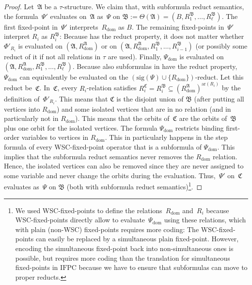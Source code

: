 \documentclass[]{lmcs}
\newcommand{\set}[1]{\lbrace #1 \rbrace}
\newcommand{\formA}{\Phi}
\newcommand{\formB}{\Psi}
\newcommand{\interpret}{\Theta}
\newcommand{\rel}{R}
\newcommand{\StructA}{\mathfrak{A}}
\newcommand{\StructB}{\mathfrak{B}}
\newcommand{\StructC}{\mathfrak{C}}
\newcommand{\arity}[1]{\mathrm{ar}(#1)}
\newcommand{\sigA}{\tau}
\newcommand{\sigOf}[1]{\mathrm{sig}(#1)}
\newcommand{\IFPC}{\ensuremath{\mathrm{IFPC}}}
\begin{document}
\begin{proof}
	Let~$\StructA$ be a $\sigA$-structure.
	We claim that, with subformula reduct semantics,
	the formula~$\formB'$ evaluates on~$\StructA$ as~$\formB$ on $\StructB := \interpret(\StructA) = (B, \rel_1^{\StructB}, \dots, \rel_\ell^\StructB)$.
	The first fixed-point in~$\formB'$ interprets~$\rel_{\text{dom}}$ as $B$.
	The remaining fixed-points in~$\formB'$ interpret $\rel_i$ as $\rel_i^{\StructB}$:
	Because \IFPCWSCsub{} has the reduct property,
	it does not matter whether $\formA'_{\rel_i}$ is evaluated on $(\StructA, \rel_{\text{dom}}^\StructA)$ or on $(\StructA, \rel_{\text{dom}}^\StructA, \rel_1^\StructB, \dots, \rel_{i-1}^\StructB)$
	(or possibly some reduct of it if not all relations in $\sigA$ are used).
	Finally, $\formB_{\text{dom}}$ is evaluated on  $(\StructA, \rel_{\text{dom}}^\StructA, \rel_1^\StructB, \dots, \rel_\ell^\StructB)$.
	Because also subformulas in \IFPCWSCsub{} have the reduct property,
	$\formB_{\text{dom}}$ can equivalently be evaluated on the $(\sigOf{\formB} \cup  \set{\rel_{\text{dom}}})$-reduct.
	Let this reduct be~$\StructC$.
	In~$\StructC$, every $\rel_i$-relation satisfies $\rel_i^{\StructC} = \rel_i^\StructB \subseteq (\rel_{\text{dom}}^\StructA)^{\arity{\rel_i}}$ by the definition of~$\formA'_{\rel_i}$.
	This means that $\StructC$ is the disjoint union of $\StructB$ (after putting all vertices into $R_{\text{dom}}$)
	and some isolated vertices that are in no relation (and in particularly not in $\rel_{\text{dom}}$).
	This means that the orbits of~$\StructC$ are the orbits of~$\StructB$ plus one orbit for the isolated vertices.
	The formula $\formB_{\text{dom}}$ restricts binding first-order variables to vertices in $\rel_{\text{dom}}$.
	This in particularly happens in the step formula of every WSC-fixed-point operator that is a subformula of $\formB_{\text{dom}}$.
	This implies that the subformula reduct semantics never removes the $\rel_{\text{dom}}$ relation.
	Hence, the isolated vertices can also be removed since they are never assigned to some variable and never change the orbits during the evaluation.
	Thus,~$\formB'$ on~$\StructC$ evaluates as~$\formB$ on $\StructB$ (both with subformula reduct semantics)\footnote{We used WSC-fixed-points to define the relations~$\rel_{\text{dom}}$ and~$\rel_i$ because WSC-fixed-points directly allow to evaluate~$\formB_{\text{dom}}$ using these relations, which with plain (non-WSC) fixed-points requires more coding:
	The WSC-fixed-points can easily be replaced by a simultaneous plain fixed-point.
	However, encoding the simultaneous fixed-point back into non-simultaneous ones is possible, but requires more coding
	than the translation for simultaneous fixed-points in \IFPC{}
	because we have to ensure that subformulas can move to proper reducts.}.
\end{proof}
\end{document}
